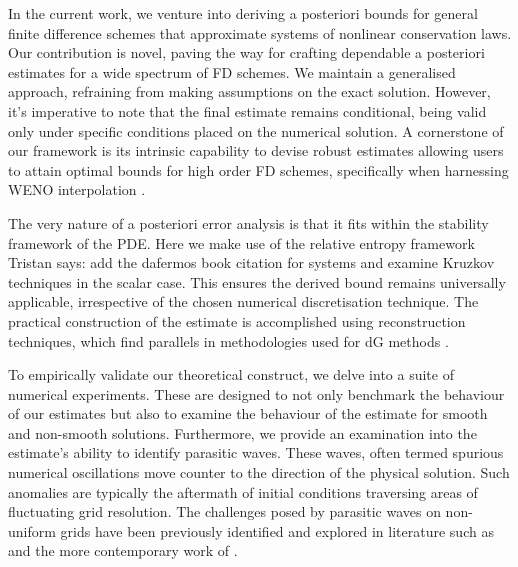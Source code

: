 \documentclass[final]{amsart}
\newcommand{\tristan}[1]{{\color{purple} Tristan says:  #1 }}
\numberwithin{equation}{section}
\begin{document}
In the current work, we venture into deriving a posteriori bounds for
general finite difference schemes that approximate systems of
nonlinear conservation laws. Our contribution is novel, paving the way
for crafting dependable a posteriori estimates for a wide spectrum of
FD schemes. We maintain a generalised approach, refraining from making
assumptions on the exact solution. However, it's imperative to note
that the final estimate remains conditional, being valid only under
specific conditions placed on the numerical solution. A cornerstone of
our framework is its intrinsic capability to devise robust estimates
allowing users to attain optimal bounds for high order FD schemes,
specifically when harnessing WENO interpolation
\cite{liu2009positivity,janett2019novel}.

The very nature of a posteriori error analysis is that it fits within
the stability framework of the PDE. Here we make use of the relative
entropy framework \cite{dafermos} \tristan{add the dafermos book
  citation} for systems and examine Kruzkov techniques
\cite{bouchut1998kruzkov} in the scalar case. This ensures the derived
bound remains universally applicable, irrespective of the chosen
numerical discretisation technique. The practical construction of the
estimate is accomplished using reconstruction techniques, which find
parallels in methodologies used for dG methods
\cite{makridakis2007space,giesselmann2015posteriori,giesselmann2017posteriori,dedner2019residual}.

To empirically validate our theoretical construct, we delve into a
suite of numerical experiments. These are designed to not only
benchmark the behaviour of our estimates but also to examine the
behaviour of the estimate for smooth and non-smooth
solutions. Furthermore, we provide an examination into the
estimate's ability to identify parasitic waves. These waves, often
termed spurious numerical oscillations move counter to the direction
of the physical solution. Such anomalies are typically the aftermath
of initial conditions traversing areas of fluctuating grid
resolution. The challenges posed by parasitic waves on non-uniform
grids have been previously identified and explored in literature such
as \cite{vichnevetsky1981energy, vichnevetsky1981propagation,
  trefethen1982group} and the more contemporary work of
\cite{long2011numerical}.
\end{document}
